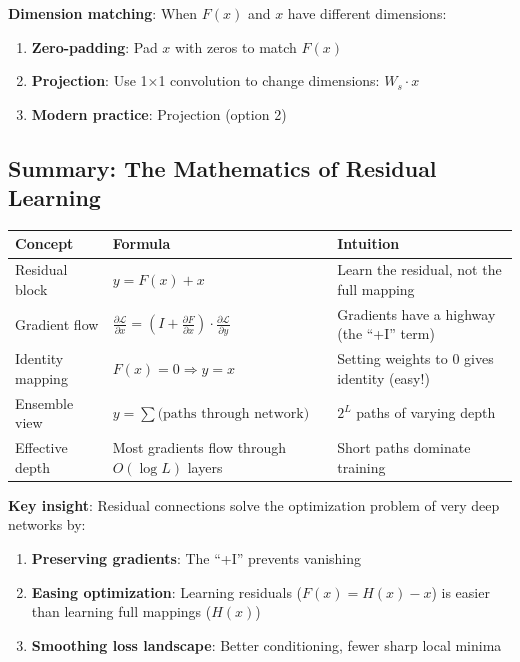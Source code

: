 \textbf{Dimension matching}: When $F(x)$ and $x$ have different dimensions:
\begin{enumerate}
\item \textbf{Zero-padding}: Pad $x$ with zeros to match $F(x)$
\item \textbf{Projection}: Use 1×1 convolution to change dimensions: $W_s \cdot x$
\item \textbf{Modern practice}: Projection (option 2)
\end{enumerate}

\subsection{Summary: The Mathematics of Residual Learning}

\begin{table}[h]
\centering
\begin{tabular}{lll}
\toprule
\textbf{Concept} & \textbf{Formula} & \textbf{Intuition} \\
\midrule
Residual block & $y = F(x) + x$ & Learn the residual, not the full mapping \\
Gradient flow & $\frac{\partial \mathcal{L}}{\partial x} = (I + \frac{\partial F}{\partial x}) \cdot \frac{\partial \mathcal{L}}{\partial y}$ & Gradients have a highway (the ``+I'' term) \\
Identity mapping & $F(x) = 0 \Rightarrow y = x$ & Setting weights to 0 gives identity (easy!) \\
Ensemble view & $y = \sum \text{(paths through network)}$ & $2^L$ paths of varying depth \\
Effective depth & Most gradients flow through $O(\log L)$ layers & Short paths dominate training \\
\bottomrule
\end{tabular}
\end{table}

\textbf{Key insight}: Residual connections solve the optimization problem of very deep networks by:
\begin{enumerate}
\item \textbf{Preserving gradients}: The ``+I'' prevents vanishing
\item \textbf{Easing optimization}: Learning residuals ($F(x) = H(x) - x$) is easier than learning full mappings ($H(x)$)
\item \textbf{Smoothing loss landscape}: Better conditioning, fewer sharp local minima
\end{enumerate}

